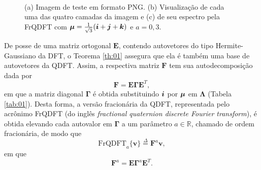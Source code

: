 \begin{figure}
	\centering
	~
	~
	~
	\caption{(a) Imagem de teste em formato PNG. (b) Visualiza\c c\~ao de cada uma das quatro camadas da imagem e (c) de seu espectro pela FrQDFT com $ \boldsymbol{\mu} = \frac{1}{\sqrt{3}}(\boldsymbol{i} + \boldsymbol{j} + \boldsymbol{k}) $ e $ a=0{,}3 $.}
\end{figure}

De posse de uma matriz ortogonal $ \mathbf{E} $, contendo autovetores do tipo Hermite-Gaussiano da DFT, o Teorema \ref{th:01} assegura que ela \'e tamb\'em uma base de autovetores da QDFT. Assim, a respectiva matriz $ \mathbf{F} $ tem sua autodecomposi\c c\~ao dada por
\begin{equation}
\label{eq:QDFTmtx}
\mathbf{F} = \mathbf{E} \boldsymbol{\Gamma} \mathbf{E}^T,
\end{equation}
em que a matriz diagonal $ \boldsymbol{\Gamma} $ \'e obtida substituindo $ \boldsymbol{i} $ por $ \boldsymbol{\mu} $ em $ \mathbf{\Lambda} $ (Tabela \ref{tab:01}). Desta forma, a vers\~ao fracion\'aria da QDFT, representada pelo acr\^onimo FrQDFT (do ingl\^es \emph{fractional quaternion discrete Fourier transform}), \'e obtida elevando cada autovalor em $ \boldsymbol{\Gamma} $ a um par\^ametro $ a \in \mathbb{R} $, chamado de ordem fracion\'aria, de modo que
\begin{equation}
\label{eq:QDFTmtxa2}
\text{FrQDFT}_a\{ \mathbf{v} \} \overset{\Delta}{=} \mathbf{F}^a \mathbf{v},
\end{equation}
em que
\begin{equation}
\label{eq:QDFTmtxa}
\mathbf{F}^a = \mathbf{E} \boldsymbol{\Gamma}^a \mathbf{E}^T.
\end{equation}

